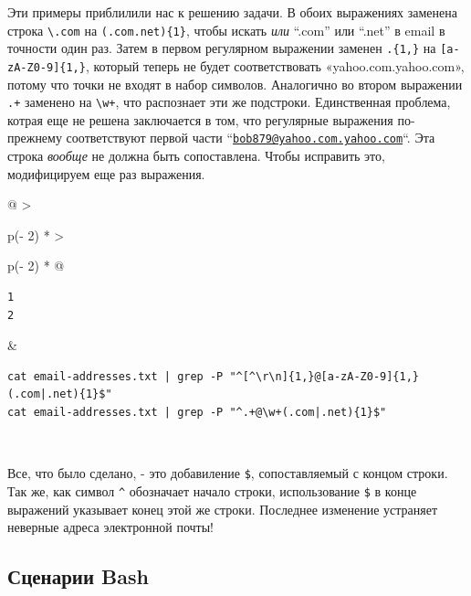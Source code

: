 \documentclass{article}
\begin{document}
Эти примеры приблилили нас к решению задачи. В обоих выражениях заменена
строка \texttt{\textbackslash{}.com} на
\texttt{(.com\textbar{}.net)\{1\}}, чтобы искать \emph{или} ``.com'' или
``.net'' в email в точности один раз. Затем в первом регулярном
выражении заменен \texttt{.\{1,\}} на \texttt{{[}a-zA-Z0-9{]}\{1,\}},
который теперь не будет соответствовать «yahoo.com.yahoo.com», потому
что точки не входят в набор символов. Аналогично во втором выражении
\texttt{.+} заменено на \texttt{\textbackslash{}w+}, что распознает эти
же подстроки. Единственная проблема, котрая еще не решена заключается в
том, что регулярные выражения по-прежнему соответствуют первой части
``\href{mailto:bob879@yahoo.com.yahoo.com}{\nolinkurl{bob879@yahoo.com.yahoo.com}}``.
Эта строка \emph{вообще} не должна быть сопоставлена. Чтобы исправить
это, модифицируем еще раз выражения.

\begin{longtable}[]{@{}
  >{\raggedright\arraybackslash}p{(\columnwidth - 2\tabcolsep) * }
  >{\raggedright\arraybackslash}p{(\columnwidth - 2\tabcolsep) * }@{}}
\toprule
\endhead
\begin{minipage}[t]{\linewidth}\raggedright
\begin{verbatim}
1
2
\end{verbatim}
\end{minipage} & \begin{minipage}[t]{\linewidth}\raggedright
\begin{verbatim}
cat email-addresses.txt | grep -P "^[^\r\n]{1,}@[a-zA-Z0-9]{1,}(.com|.net){1}$"
cat email-addresses.txt | grep -P "^.+@\w+(.com|.net){1}$"
\end{verbatim}
\end{minipage} \\ \addlinespace
\bottomrule
\end{longtable}

Все, что было сделано, - это добавиление \texttt{\$}, сопоставляемый с
концом строки. Так же, как символ \texttt{\^{}} обозначает начало
строки, использование \texttt{\$} в конце выражений указывает конец этой
же строки. Последнее изменение устраняет неверные адреса электронной
почты!

\hypertarget{Bash-Scripting}{%
\subsection{\texorpdfstring{\protect\hyperlink{Bash-Scripting}{}Сценарии
Bash}{Сценарии Bash}}\label{Bash-Scripting}}
\end{document}
